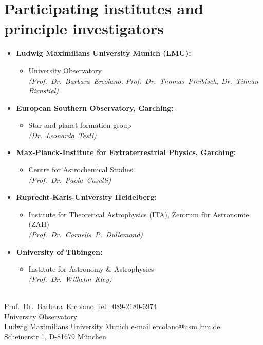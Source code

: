 \documentclass[10pt,fleqn,twoside]{article}
\begin{document}
\section{Participating institutes and 
principle investigators
}\label{app-institutes}
\begin{itemize}
\item {\bf Ludwig Maximilians University Munich (LMU):}
 \begin{itemize}
  \item University Observatory\\    
         {\em (Prof.~Dr.~Barbara~Ercolano, Prof.~Dr.~Thomas~Preibisch,
           Dr.~Tilman Birnstiel)}
  \end{itemize} 
\item {\bf European Southern Observatory, Garching:}
 \begin{itemize} 
\item Star and planet formation group \\
         {\em (Dr.~Leonardo~Testi)}
\end{itemize}
\item {\bf Max-Planck-Institute for Extraterrestrial Physics, Garching:}
 \begin{itemize} 
\item Centre for Astrochemical Studies \\
         {\em (Prof.~Dr.~Paola~Caselli)}
\end{itemize}
\item {\bf Ruprecht-Karls-University Heidelberg:}
\begin{itemize}
 \item Institute for Theoretical Astrophysics (ITA), Zentrum f\"ur Astronomie (ZAH)\\
         {\em (Prof.~Dr.~Cornelis~P.~Dullemond)}
\end{itemize}
\item {\bf University of T\"ubingen:}
\begin{itemize}
  \item Institute for Astronomy \& Astrophysics\\
         {\em (Prof.~Dr.~Wilhelm~Kley)}
\end{itemize}
\end{itemize}
%
\vfill

\\
Prof.~Dr.~Barbara~Ercolano \hfill Tel.: 089-2180-6974\\
University Observatory  \\
Ludwig Maximilians University Munich \hfill e-mail ercolano@usm.lmu.de\\
Scheinerstr 1, D-81679 M\"unchen\\
\end{document}
